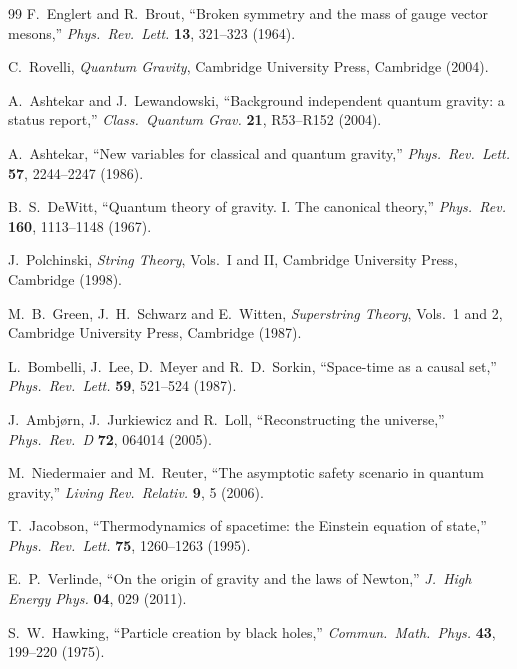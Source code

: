 \documentclass[a4paper]{article}
\begin{document}
\begin{thebibliography}{99}
F.~Englert and R.~Brout,
``Broken symmetry and the mass of gauge vector mesons,''
\textit{Phys.\ Rev.\ Lett.} \textbf{13}, 321--323 (1964).

C.~Rovelli,
\textit{Quantum Gravity},
Cambridge University Press, Cambridge (2004).

A.~Ashtekar and J.~Lewandowski,
``Background independent quantum gravity: a status report,''
\textit{Class.\ Quantum Grav.} \textbf{21}, R53--R152 (2004).

A.~Ashtekar,
``New variables for classical and quantum gravity,''
\textit{Phys.\ Rev.\ Lett.} \textbf{57}, 2244--2247 (1986).

B.~S.~DeWitt,
``Quantum theory of gravity. I. The canonical theory,''
\textit{Phys.\ Rev.} \textbf{160}, 1113--1148 (1967).

J.~Polchinski,
\textit{String Theory}, Vols.\ I and II,
Cambridge University Press, Cambridge (1998).

M.~B.~Green, J.~H.~Schwarz and E.~Witten,
\textit{Superstring Theory}, Vols.\ 1 and 2,
Cambridge University Press, Cambridge (1987).

L.~Bombelli, J.~Lee, D.~Meyer and R.~D.~Sorkin,
``Space-time as a causal set,''
\textit{Phys.\ Rev.\ Lett.} \textbf{59}, 521--524 (1987).

J.~Ambj{\o}rn, J.~Jurkiewicz and R.~Loll,
``Reconstructing the universe,''
\textit{Phys.\ Rev.\ D} \textbf{72}, 064014 (2005).

M.~Niedermaier and M.~Reuter,
``The asymptotic safety scenario in quantum gravity,''
\textit{Living Rev.\ Relativ.} \textbf{9}, 5 (2006).

T.~Jacobson,
``Thermodynamics of spacetime: the Einstein equation of state,''
\textit{Phys.\ Rev.\ Lett.} \textbf{75}, 1260--1263 (1995).

E.~P.~Verlinde,
``On the origin of gravity and the laws of Newton,''
\textit{J.\ High Energy Phys.} \textbf{04}, 029 (2011).

S.~W.~Hawking,
``Particle creation by black holes,''
\textit{Commun.\ Math.\ Phys.} \textbf{43}, 199--220 (1975).


\end{thebibliography}
\end{document}

